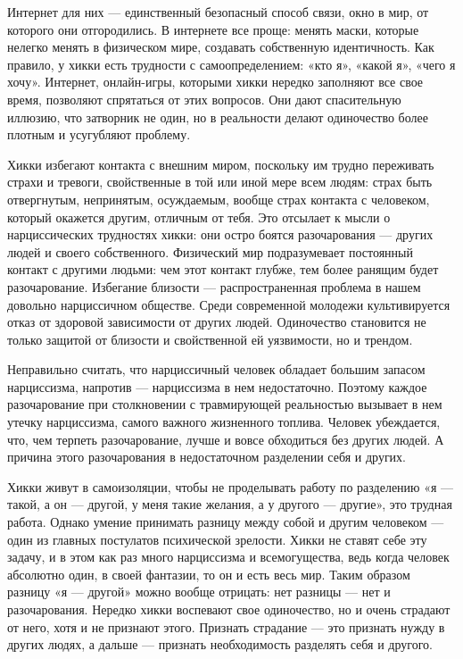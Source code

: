 Интернет для них — единственный безопасный способ связи, окно в мир, от которого они отгородились. В интернете все проще: менять маски, которые нелегко менять в физическом мире, создавать собственную идентичность. Как правило, у хикки есть трудности с самоопределением: «кто я», «какой я», «чего я хочу». Интернет, онлайн-игры, которыми хикки нередко заполняют все свое время, позволяют спрятаться от этих вопросов. Они дают спасительную иллюзию, что затворник не один, но в реальности делают одиночество более плотным и усугубляют проблему.

Хикки избегают контакта с внешним миром, поскольку им трудно переживать страхи и тревоги, свойственные в той или иной мере всем людям: страх быть отвергнутым, непринятым, осуждаемым, вообще страх контакта с человеком, который окажется другим, отличным от тебя. Это отсылает к мысли о нарциссических трудностях хикки: они остро боятся разочарования — других людей и своего собственного. Физический мир подразумевает постоянный контакт с другими людьми: чем этот контакт глубже, тем более ранящим будет разочарование. Избегание близости — распространенная проблема в нашем довольно нарциссичном обществе. Среди современной молодежи культивируется отказ от здоровой зависимости от других людей. Одиночество становится не только защитой от близости и свойственной ей уязвимости, но и трендом.

Неправильно считать, что нарциссичный человек обладает большим запасом нарциссизма, напротив — нарциссизма в нем недостаточно. Поэтому каждое разочарование при столкновении с травмирующей реальностью вызывает в нем утечку нарциссизма, самого важного жизненного топлива. Человек убеждается, что, чем терпеть разочарование, лучше и вовсе обходиться без других людей. А причина этого разочарования в недостаточном разделении себя и других.

Хикки живут в самоизоляции, чтобы не проделывать работу по разделению «я — такой, а он — другой, у меня такие желания, а у другого — другие», это трудная работа. Однако умение принимать разницу между собой и другим человеком — один из главных постулатов психической зрелости. Хикки не ставят себе эту задачу, и в этом как раз много нарциссизма и всемогущества, ведь когда человек абсолютно один, в своей фантазии, то он и есть весь мир. Таким образом разницу «я — другой» можно вообще отрицать: нет разницы — нет и разочарования. Нередко хикки воспевают свое одиночество, но и очень страдают от него, хотя и не признают этого. Признать страдание — это признать нужду в других людях, а дальше — признать необходимость разделять себя и другого.

